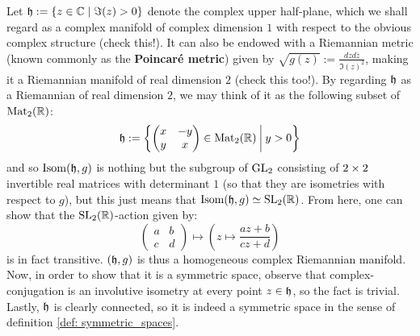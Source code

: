             \begin{example} \label{example: upper_half_plane_is_a_symmetric_space}
                Let $\mathfrak{h} := \{z \in \mathbb{C} \mid \Im(z) > 0 \}$ denote the complex upper half-plane, which we shall regard as a complex manifold of complex dimension $1$ with respect to the obvious complex structure (check this!). It can also be endowed with a Riemannian metric (known commonly as the \textbf{Poincar\'e metric}) given by $\sqrt{g(z)} := \frac{dz d\overline{z}}{\Im(z)^2}$, making it a Riemannian manifold of real dimension $2$ (check this too!). By regarding $\mathfrak{h}$ as a Riemannian of real dimension $2$, we may think of it as the following subset of $\mathrm{Mat}_2(\mathbb{R})$:
                    $$
                        \mathfrak{h} :=
                        \left\{
                            \begin{pmatrix}
                                x & -y
                                \\
                                y & x
                            \end{pmatrix}
                            \in \mathrm{Mat}_2(\mathbb{R})
                            \:
                            \bigg|
                            \:
                            y > 0
                        \right\}
                    $$
                and so $\mathrm{Isom}(\mathfrak{h}, g)$ is nothing but the subgroup of $\operatorname{GL}_2$ consisting of $2 \x 2$ invertible real matrices with determinant $1$ (so that they are isometries with respect to $g$), but this just means that $\mathrm{Isom}(\mathfrak{h}, g) \simeq \operatorname{SL}_2(\mathbb{R})$. From here, one can show that the $\operatorname{SL}_2(\mathbb{R})$-action given by:
                    $$\begin{pmatrix}a & b\\c & d\end{pmatrix} \mapsto \left(z \mapsto \frac{az + b}{cz + d}\right)$$
                is in fact transitive. $(\mathfrak{h}, g)$ is thus a homogeneous complex Riemannian manifold. Now, in order to show that it is a symmetric space, observe that complex-conjugation is an involutive isometry at every point $z \in \mathfrak{h}$, so the fact is trivial. Lastly, $\mathfrak{h}$ is clearly connected, so it is indeed a symmetric space in the sense of definition \ref{def: symmetric_spaces}.
            \end{example}
            \begin{example} \label{example: complex_projective_line_is_a_symmetric_space}
                    
            \end{example}
